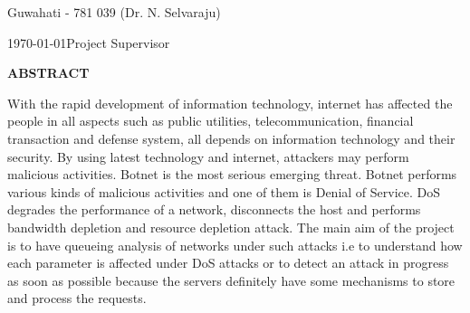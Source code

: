 \documentclass[12pt,a4paper]{report}
\theoremstyle{plain}
\theoremstyle{definition}
\theoremstyle{remark}
\begin{document}
\vspace{4cm}

\noindent Guwahati - 781 039 \hfill (Dr. N. Selvaraju)

\noindent \today \hfill Project Supervisor

\clearpage

\begin{center}
{\Large{\bf{ABSTRACT}}}
\end{center}


With the rapid development of information technology, internet has affected the people in all aspects such as public utilities, telecommunication, financial transaction and defense system, all depends on information technology and their security. By using latest technology and internet, attackers may perform malicious activities. Botnet is the most serious emerging threat. Botnet performs various kinds of malicious activities and one of them is Denial of Service. DoS degrades the performance of a network, disconnects the host and performs bandwidth depletion and resource depletion attack. The main aim of the project is to have queueing analysis of networks under such attacks i.e to understand how each parameter is affected under DoS attacks or to detect an attack in progress as soon as possible because the servers definitely have some mechanisms to store and process the requests. 

\clearpage



\tableofcontents
\clearpage

\newpage

\setcounter{page}{1}








\pagebreak
\nocite{m1} \nocite{m2} \nocite{m3} \nocite{m4} \nocite{m5} \nocite{m6} \nocite{m7} \nocite{m8} \nocite{m9} 



\end{document}
